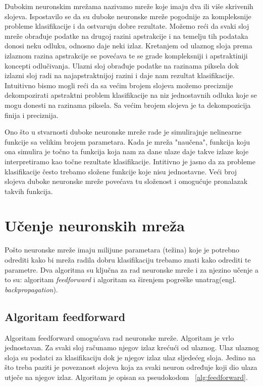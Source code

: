 \documentclass[times, utf8, zavrsni, numeric]{fer}
\begin{document}
Dubokim neuronskim mrežama nazivamo mreže koje imaju dva ili više skrivenih slojeva. Ispostavilo se da su duboke neuronske mreže pogodnije za kompleksnije probleme klasifikacije i da ostvaruju dobre rezultate. Možemo reći da svaki sloj mreže obrađuje podatke na drugoj razini apstrakcije i na temelju tih podataka donosi neku odluku, odnosno daje neki izlaz. Kretanjem od ulaznog sloja prema izlaznom razina apstrakcije se povećava te se grade kompleksniji i apstraktiniji koncepti odlučivanja. Ulazni sloj obrađuje podatke na razinama piksela dok izlazni sloj radi na najapstraktnijoj razini i daje nam rezultat klasifikacije. Intuitivno bismo mogli reći da sa većim brojem slojeva možemo preciznije dekompozirati apstraktni problem klasifikacije na niz jednostavnih odluka koje se mogu donesti na razinama piksela. Sa većim brojem slojeva je ta dekompozicija finija i preciznija.

Ono što u stvarnosti duboke neuronske mreže rade je simulirajnje nelinearne funkcije sa velikim brojem parametara. Kada je mreža "naučena", funkcija koju ona simulira je točno ta funkcija koja nam za dane ulaze daje takve izlaze koje interpretiramo kao točne rezultate klasifikacije. Intitivno je jasno da za probleme klasifikacije često trebamo složene funkcije koje nisu jednostavne. Veći broj slojeva duboke neuronske mreže povećava tu složenost i omogućuje pronalazak takvih funkcija.

\section{Učenje neuronskih mreža}
Pošto neuronske mreže imaju milijune parametara (težina) koje je potrebno odrediti kako bi mreža radila dobru klasifikaciju trebamo znati kako odrediti te parametre. Dva algoritma su ključna za rad neuronske mreže i za njezino učenje a to su: algoritam \textit{feedforward} i algoritam sa širenjem pogreške unatrag(engl. \textit{backpropagation}).

\subsection{Algoritam feedforward}
Algoritam feedforward omogućava rad neuronske mreže. Algoritam je vrlo jednostavan. Za svaki sloj računamo njegov izlaz krećući od ulaznog. Ulaz ulaznog sloja su podatci za klasifikaciju dok je njegov izlaz ulaz sljedećeg sloja. Jedino na što treba paziti je povezanost slojeva koja za svaki neuron određuje koji dio ulaza utječe na njegov izlaz. Algoritam je opisan sa pseudokodom ~\ref{alg:feedforward}.
\end{document}

